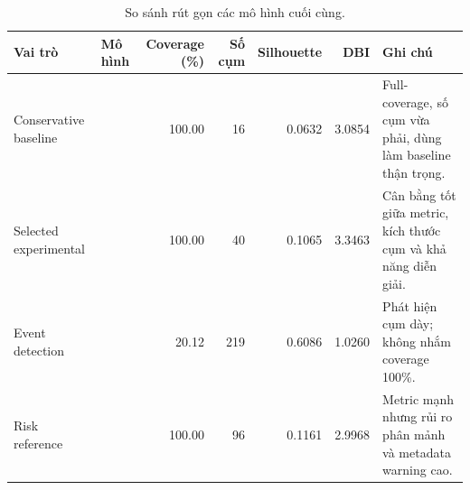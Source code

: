 \begin{table}[H]
\centering
\small
\caption{So sánh rút gọn các mô hình cuối cùng.}
\label{tab:final-models}
\begin{tabularx}{\textwidth}{L{0.24\textwidth} L{0.32\textwidth} r r r r Y}
\toprule
Vai trò & Mô hình & Coverage (\%) & Số cụm & Silhouette & DBI & Ghi chú \\
\midrule
Conservative baseline &  & 100.00 & 16 & 0.0632 & 3.0854 & Full-coverage, số cụm vừa phải, dùng làm baseline thận trọng. \\
Selected experimental &  & 100.00 & 40 & 0.1065 & 3.3463 & Cân bằng tốt giữa metric, kích thước cụm và khả năng diễn giải. \\
Event detection &  & 20.12 & 219 & 0.6086 & 1.0260 & Phát hiện cụm dày; không nhắm coverage 100\%. \\
Risk reference &  & 100.00 & 96 & 0.1161 & 2.9968 & Metric mạnh nhưng rủi ro phân mảnh và metadata warning cao. \\
\bottomrule
\end{tabularx}
\end{table}
